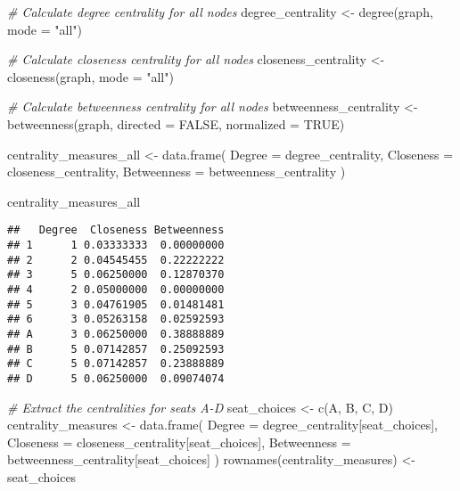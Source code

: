 \documentclass[
]{article}
\newenvironment{Shaded}{\begin{snugshade}}{\end{snugshade}}
\newcommand{\AttributeTok}[1]{\textcolor[rgb]{0.77,0.63,0.00}{#1}}
\newcommand{\CommentTok}[1]{\textcolor[rgb]{0.56,0.35,0.01}{\textit{#1}}}
\newcommand{\ConstantTok}[1]{\textcolor[rgb]{0.00,0.00,0.00}{#1}}
\newcommand{\FunctionTok}[1]{\textcolor[rgb]{0.00,0.00,0.00}{#1}}
\newcommand{\NormalTok}[1]{#1}
\newcommand{\OtherTok}[1]{\textcolor[rgb]{0.56,0.35,0.01}{#1}}
\newcommand{\StringTok}[1]{\textcolor[rgb]{0.31,0.60,0.02}{#1}}
\begin{document}
\begin{Shaded}
\begin{Highlighting}[]
\CommentTok{\# Calculate degree centrality for all nodes}
\NormalTok{degree\_centrality }\OtherTok{\textless{}{-}} \FunctionTok{degree}\NormalTok{(graph, }\AttributeTok{mode =} \StringTok{"all"}\NormalTok{)}

\CommentTok{\# Calculate closeness centrality for all nodes}
\NormalTok{closeness\_centrality }\OtherTok{\textless{}{-}} \FunctionTok{closeness}\NormalTok{(graph, }\AttributeTok{mode =} \StringTok{"all"}\NormalTok{)}

\CommentTok{\# Calculate betweenness centrality for all nodes}
\NormalTok{betweenness\_centrality }\OtherTok{\textless{}{-}} \FunctionTok{betweenness}\NormalTok{(graph, }\AttributeTok{directed =} \ConstantTok{FALSE}\NormalTok{, }\AttributeTok{normalized =} \ConstantTok{TRUE}\NormalTok{)}

\NormalTok{centrality\_measures\_all }\OtherTok{\textless{}{-}} \FunctionTok{data.frame}\NormalTok{(}
  \AttributeTok{Degree =}\NormalTok{ degree\_centrality,}
  \AttributeTok{Closeness =}\NormalTok{ closeness\_centrality,}
  \AttributeTok{Betweenness =}\NormalTok{ betweenness\_centrality}
\NormalTok{)}

\NormalTok{centrality\_measures\_all}
\end{Highlighting}
\end{Shaded}

\begin{verbatim}
##   Degree  Closeness Betweenness
## 1      1 0.03333333  0.00000000
## 2      2 0.04545455  0.22222222
## 3      5 0.06250000  0.12870370
## 4      2 0.05000000  0.00000000
## 5      3 0.04761905  0.01481481
## 6      3 0.05263158  0.02592593
## A      3 0.06250000  0.38888889
## B      5 0.07142857  0.25092593
## C      5 0.07142857  0.23888889
## D      5 0.06250000  0.09074074
\end{verbatim}

\begin{Shaded}
\begin{Highlighting}[]
\CommentTok{\# Extract the centralities for seats A{-}D}
\NormalTok{seat\_choices }\OtherTok{\textless{}{-}} \FunctionTok{c}\NormalTok{(}\StringTok{\textquotesingle{}A\textquotesingle{}}\NormalTok{, }\StringTok{\textquotesingle{}B\textquotesingle{}}\NormalTok{, }\StringTok{\textquotesingle{}C\textquotesingle{}}\NormalTok{, }\StringTok{\textquotesingle{}D\textquotesingle{}}\NormalTok{)}
\NormalTok{centrality\_measures }\OtherTok{\textless{}{-}} \FunctionTok{data.frame}\NormalTok{(}
  \AttributeTok{Degree =}\NormalTok{ degree\_centrality[seat\_choices],}
  \AttributeTok{Closeness =}\NormalTok{ closeness\_centrality[seat\_choices],}
  \AttributeTok{Betweenness =}\NormalTok{ betweenness\_centrality[seat\_choices]}
\NormalTok{)}
\FunctionTok{rownames}\NormalTok{(centrality\_measures) }\OtherTok{\textless{}{-}}\NormalTok{ seat\_choices}
\end{Highlighting}
\end{Shaded}
\end{document}

